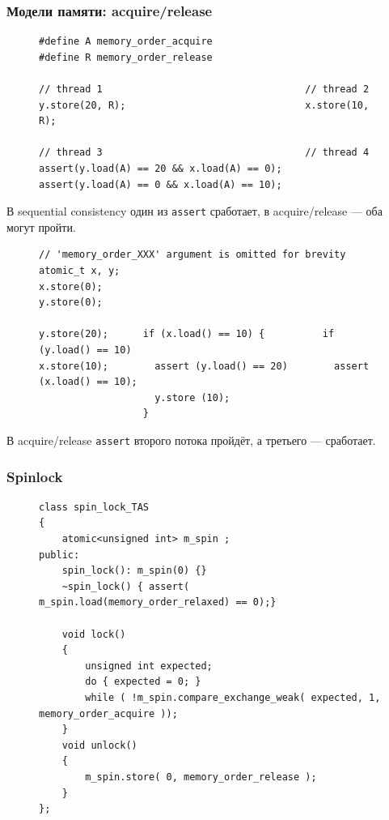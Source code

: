\documentclass[aspectratio=169, pdf, 8pt, unicode]{beamer}
\begin{document}
\begin{frame}[fragile]
\frametitle{Модели памяти: acquire/release}
\begin{figure}[H]
\begin{BVerbatim}
#define A memory_order_acquire
#define R memory_order_release

// thread 1                                   // thread 2
y.store(20, R);                               x.store(10, R);

// thread 3                                   // thread 4
assert(y.load(A) == 20 && x.load(A) == 0);    assert(y.load(A) == 0 && x.load(A) == 10); 
\end{BVerbatim}
\end{figure}

В sequential consistency один из \texttt{assert} сработает, в acquire/release --- оба могут пройти.

\begin{figure}[H]
\begin{BVerbatim}
// 'memory_order_XXX' argument is omitted for brevity
atomic_t x, y;
x.store(0);
y.store(0);

y.store(20);      if (x.load() == 10) {          if (y.load() == 10)
x.store(10);        assert (y.load() == 20)        assert (x.load() == 10);
                    y.store (10);
                  }
\end{BVerbatim}
\end{figure}

В acquire/release \texttt{assert} второго потока пройдёт, а третьего --- сработает.

\end{frame}

\begin{frame}[fragile]
\frametitle{Spinlock}
\begin{figure}[H]
\centering
\begin{minipage}{0.8\textwidth}
\begin{verbatim}
class spin_lock_TAS
{
    atomic<unsigned int> m_spin ;
public:
    spin_lock(): m_spin(0) {}
    ~spin_lock() { assert( m_spin.load(memory_order_relaxed) == 0);}

    void lock()
    {
        unsigned int expected;
        do { expected = 0; }
        while ( !m_spin.compare_exchange_weak( expected, 1, memory_order_acquire ));
    }
    void unlock()
    {
        m_spin.store( 0, memory_order_release );
    }
};
\end{verbatim}
\end{minipage}
\end{figure}
\end{frame}
\end{document}

